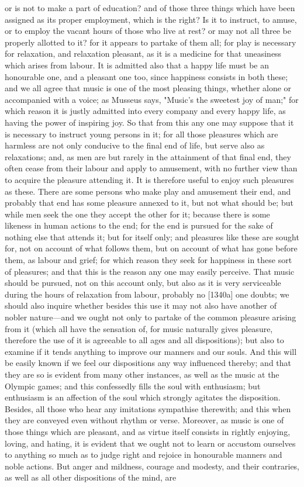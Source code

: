 \documentclass[12pt]{article}
\begin{document}
or is not to make a part of education? and of those three things which have been assigned as its proper employment, which is the right? Is it to instruct, to amuse, or to employ the vacant hours of those who live at rest? or may not all three be properly allotted to it? for it appears to partake of them all; for play is necessary for relaxation, and relaxation pleasant, as it is a medicine for that uneasiness which arises from labour. It is admitted also that a happy life must be an honourable one, and a pleasant one too, since happiness consists in both these; and we all agree that music is one of the most pleasing things, whether alone or accompanied with a voice; as Musseus says, "Music's the sweetest joy of man;" for which reason it is justly admitted into every company and every happy life, as having the power of inspiring joy. So that from this any one may suppose that it is necessary to instruct young persons in it; for all those pleasures which are harmless are not only conducive to the final end of life, but serve also as relaxations; and, as men are but rarely in the attainment of that final end, they often cease from their labour and apply to amusement, with no further view than to acquire the pleasure attending it. It is therefore useful to enjoy such pleasures as these. There are some persons who make play and amusement their end, and probably that end has some pleasure annexed to it, but not what should be; but while men seek the one they accept the other for it; because there is some likeness in human actions to the end; for the end is pursued for the sake of nothing else that attends it; but for itself only; and pleasures like these are sought for, not on account of what follows them, but on account of what has gone before them, as labour and grief; for which reason they seek for happiness in these sort of pleasures; and that this is the reason any one may easily perceive. That music should be pursued, not on this account only, but also as it is very serviceable during the hours of relaxation from labour, probably no [1340a] one doubts; we should also inquire whether besides this use it may not also have another of nobler nature---and we ought not only to partake of the common pleasure arising from it (which all have the sensation of, for music naturally gives pleasure, therefore the use of it is agreeable to all ages and all dispositions); but also to examine if it tends anything to improve our manners and our souls. And this will be easily known if we feel our dispositions any way influenced thereby; and that they are so is evident from many other instances, as well as the music at the Olympic games; and this confessedly fills the soul with enthusiasm; but enthusiasm is an affection of the soul which strongly agitates the disposition. Besides, all those who hear any imitations sympathise therewith; and this when they are conveyed even without rhythm or verse. Moreover, as music is one of those things which are pleasant, and as virtue itself consists in rightly enjoying, loving, and hating, it is evident that we ought not to learn or accustom ourselves to anything so much as to judge right and rejoice in honourable manners and noble actions. But anger and mildness, courage and modesty, and their contraries, as well as all other dispositions of the mind, are 
\end{document}
